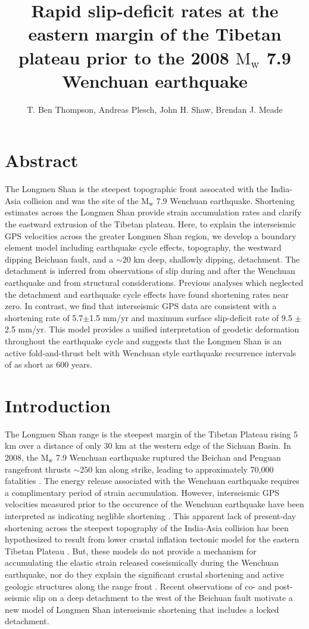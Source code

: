 \documentclass[12pt]{article}
\title{Rapid slip-deficit rates at the eastern margin of the Tibetan plateau prior to the 2008 $\textrm{M}_\textrm{w}$ 7.9 Wenchuan earthquake}
\author{T. Ben Thompson, Andreas Plesch, John H. Shaw, Brendan J. Meade}
\begin{document}
\maketitle

\section{Abstract}
The Longmen Shan is the steepest topographic front assocated with the India-Asia collision and was the site of the $\textrm{M}_{\textrm{w}}$ 7.9  Wenchuan earthquake. Shortening estimates across the Longmen Shan provide strain accumulation rates and clarify the eastward extrusion of the Tibetan plateau. Here, to explain the interseismic GPS velocities across the greater Longmen Shan region, we develop a boundary element model including earthquake cycle effects, topography, the westward dipping Beichuan fault, and a ${\sim}20$ km deep, shallowly dipping, detachment. The detachment is inferred from observations of slip during and after the Wenchuan earthquake and from structural considerations. Previous analyses which neglected the detachment and earthquake cycle effects have found shortening rates near zero. In contrast, we find that interseismic GPS data are consistent with a shortening rate of 5.7$\pm$1.5 mm/yr and maximum surface slip-deficit rate of 9.5 $\pm$ 2.5 mm/yr. This model provides a unified interpretation of geodetic deformation throughout the earthquake cycle and suggests that the Longmen Shan is an active fold-and-thrust belt with Wenchuan style earthquake recurrence intervals of as short as 600 years.

\section{Introduction}
The Longmen Shan range is the steepest margin of the Tibetan Plateau rising 5 km over a distance of only 30 km at the western edge of the Sichuan Basin. In 2008, the $\textrm{M}_{\textrm{w}}$ 7.9 Wenchuan earthquake ruptured the Beichan and Penguan rangefront thrusts ${\sim}250$ km along strike, leading to approximately 70,000 fatalities \citep{Hubbard2009, Xu2009, Lin2009}. The energy release associated with the Wenchuan earthquake requires a complimentary period of strain accumulation. However, interseismic GPS velocities measured prior to the occurence of the Wenchuan earthquake have been interpreted as indicating neglible shortening \citep{king97, chen00, shen05, Meade07c, Loveless2011}. This apparent lack of present-day shortening across the steepest topography of the India-Asia collision has been hypothesized to result from lower crustal inflation tectonic model for the eastern Tibetan Plateau \citep{royden97, bird91, Burchfiel2008, Clark2000}. But, these models do not provide a mechanism for accumulating the elastic strain released coseismically during the Wenchuan earthquake, nor do they explain the significant crustal shortening and active geologic structures along the range front \citep{Hubbard2010, Li2010a, Wang2013, Wang2014}. Recent observations of co- and post-seismic slip on a deep detachment to the west of the Beichuan fault\citep{Qi2011, Fielding2013b} motivate a new model of Longmen Shan interseismic shortening that includes a locked detachment.
\end{document}
